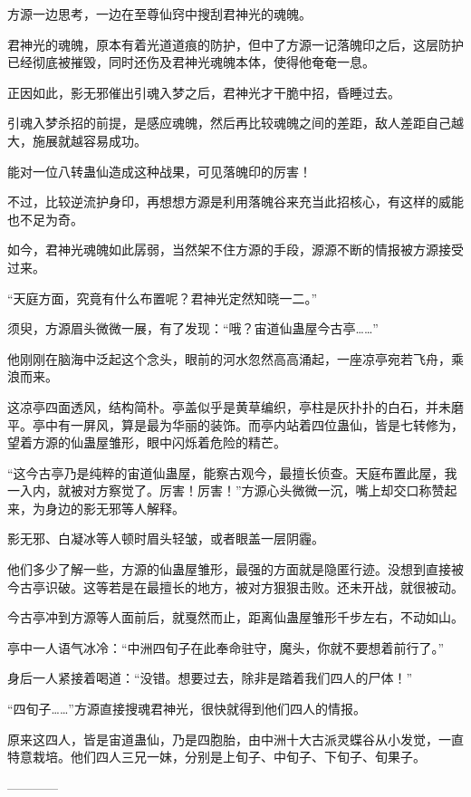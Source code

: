 \begin{this_body}
方源一边思考，一边在至尊仙窍中搜刮君神光的魂魄。

君神光的魂魄，原本有着光道道痕的防护，但中了方源一记落魄印之后，这层防护已经彻底被摧毁，同时还伤及君神光魂魄本体，使得他奄奄一息。

正因如此，影无邪催出引魂入梦之后，君神光才干脆中招，昏睡过去。

引魂入梦杀招的前提，是感应魂魄，然后再比较魂魄之间的差距，敌人差距自己越大，施展就越容易成功。

能对一位八转蛊仙造成这种战果，可见落魄印的厉害！

不过，比较逆流护身印，再想想方源是利用落魄谷来充当此招核心，有这样的威能也不足为奇。

如今，君神光魂魄如此孱弱，当然架不住方源的手段，源源不断的情报被方源接受过来。

“天庭方面，究竟有什么布置呢？君神光定然知晓一二。”

须臾，方源眉头微微一展，有了发现：“哦？宙道仙蛊屋今古亭……”

他刚刚在脑海中泛起这个念头，眼前的河水忽然高高涌起，一座凉亭宛若飞舟，乘浪而来。

这凉亭四面透风，结构简朴。亭盖似乎是黄草编织，亭柱是灰扑扑的白石，并未磨平。亭中有一屏风，算是最为华丽的装饰。而亭内站着四位蛊仙，皆是七转修为，望着方源的仙蛊屋雏形，眼中闪烁着危险的精芒。

“这今古亭乃是纯粹的宙道仙蛊屋，能察古观今，最擅长侦查。天庭布置此屋，我一入内，就被对方察觉了。厉害！厉害！”方源心头微微一沉，嘴上却交口称赞起来，为身边的影无邪等人解释。

影无邪、白凝冰等人顿时眉头轻皱，或者眼盖一层阴霾。

他们多少了解一些，方源的仙蛊屋雏形，最强的方面就是隐匿行迹。没想到直接被今古亭识破。这等若是在最擅长的地方，被对方狠狠击败。还未开战，就很被动。

今古亭冲到方源等人面前后，就戛然而止，距离仙蛊屋雏形千步左右，不动如山。

亭中一人语气冰冷：“中洲四旬子在此奉命驻守，魔头，你就不要想着前行了。”

身后一人紧接着喝道：“没错。想要过去，除非是踏着我们四人的尸体！”

“四旬子……”方源直接搜魂君神光，很快就得到他们四人的情报。

原来这四人，皆是宙道蛊仙，乃是四胞胎，由中洲十大古派灵蝶谷从小发觉，一直特意栽培。他们四人三兄一妹，分别是上旬子、中旬子、下旬子、旬果子。

------------

\end{this_body}

